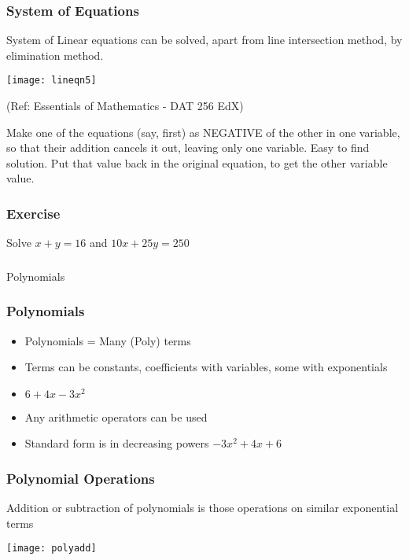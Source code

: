  \begin{frame}[fragile]\frametitle{System of Equations}
System of Linear equations can be solved, apart from line intersection method, by elimination method.
\begin{center}
\texttt{[image: lineqn5]}

{\tiny (Ref: Essentials of Mathematics - DAT 256 EdX)}
\end{center}
Make one of the equations (say, first) as NEGATIVE of the other in one variable, so that their addition cancels it out, leaving only one variable. Easy to find solution. Put that value back in the original equation, to get the other variable value.
\end{frame}

 \begin{frame}[fragile]\frametitle{Exercise}
Solve $x + y = 16$ and $10x + 25y = 250$
\end{frame}





\begin{frame}[fragile]\frametitle{}
\begin{center}
{\Large Polynomials}
\end{center}
\end{frame}



 \begin{frame}[fragile]\frametitle{Polynomials}
\begin{itemize}
\item Polynomials = Many (Poly) terms
\item Terms can be constants, coefficients with variables, some with exponentials
\item $6 + 4x - 3 x^2$
\item Any arithmetic operators can be used
\item Standard form is in decreasing powers $-3x^2 + 4x + 6$
\end{itemize}
\end{frame}

 \begin{frame}[fragile]\frametitle{Polynomial Operations}
Addition or subtraction of polynomials is those operations on similar exponential terms
\begin{center}
\texttt{[image: polyadd]}
\end{center}
\end{frame}


